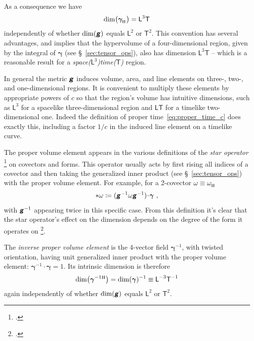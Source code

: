 \documentclass[\ifafour a4paper,12pt,\else a5paper,10pt,\fi%
onecolumn,oneside,article,%
british%
]{memoir}
\makeatletter
\theoremstyle{remark}
\theoremstyle{innote}
\newcommand*{\mathte}[1]{\textbf{\textit{\textsf{#1}}}}
\newcommand*{\citep}{\footcites}
\newcommand*{\defd}{\coloneqq}
\renewcommand*{\|}[1][]{\nonscript\,#1\vert\nonscript\;\mathopen{}}
\newcommand*{\sect}{\S}%
\newcommand*{\sects}{\S\S}%
\newcommand*{\eg}{{e.g.}}
\newcommand*{\cf}{{cf.}}
\newcommand*{\q}{}%
\DeclareRobustCommand*{\q}{%
  \mathord{\mathpalette\bigcdot@{}}%
}
\newcommand*{\bigcdot@scalefactor}{0.7}
\newcommand*{\bigcdot@widthfactor}{1.5}
\newcommand*{\bigcdot@}[2]{%
  \sbox0{$#1\vcenter{}$}%
  \sbox2{$#1\cdot\m@th$}%
  \hbox to \bigcdot@widthfactor\wd2{%
    \hfil
    \raise\ht0\hbox{%
      \scalebox{\bigcdot@scalefactor}{%
        \lower\ht0\hbox{$#1\bullet\m@th$}%
      }%
    }%
    \hfil
  }%
}
\newcommand*{\Le}{\textsf{L}}
\newcommand*{\Ti}{\textsf{T}}
\newcommand*{\Li}{\textsf{L}}
\newcommand*{\ii}{\mathbin{\!\cdot\!}}
\newcommand*{\yg}{\mathte{g}}
\renewcommand*{\i}{\indices}
\newcommand*{\ygv}{\bm{\gamma}}
\newcommand*{\rul}{{\mkern2mu\rule[-0.1ex]{0.75pt}{1.1ex}\mkern2mu}}
\DeclarePairedDelimiter\mul{\rul}{\rul}%
\makeatother
\begin{document}
As a consequence we have
\begin{equation}
  \label{eq:dim_volume_elem}
  \dim\bigl(\ygv\i{_{\mul{\q\q\q\q}}}\bigr) = \Le^{3}\Ti
\end{equation}
independently of whether $\dim(\yg)$ equals $\Li^{2}$ or $\Ti^{2}$. This
convention has several advantages, and implies that the hypervolume of a
four-dimensional region, given by the integral of $\ygv$ (see
\sect~\ref{sec:tensor_ops}), also has dimension $\Li^{3}\Ti$ -- which is a
reasonable result for a
\emph{space\textnormal{($\Le^{3}$)}time\textnormal{($\Ti$)}} region.

In general the metric $\yg$ induces volume, area, and line elements on
three-, two-, and one-dimensional regions. It is convenient to multiply
these elements by appropriate powers of $c$ so that the region's volume has
intuitive dimensions, such as $\Li^{3}$ for a spacelike three-dimensional
region and $\Li\Ti$ for a timelike two-dimensional one. Indeed the
definition of proper time~\eqref{eq:proper_time_c} does exactly this,
including a factor $1/c$ in the induced line element on a timelike curve.

The proper volume element appears in the various definitions of the
\emph{star operator}
\citep[\eg][\sect~V.A.4]{choquetbruhatetal1977_r1996}[Box~4.3]{misneretal1970_r1973}[\sect~IV.24]{burke1985_r1987}
on covectors and forms. This operator usually acts by first rising all
indices of a covector and then taking the generalized inner product (see
\sect~\ref{sec:tensor_ops}) with the proper volume element. For example,
for a 2-covector $\omega \equiv \omega\i{_{\mul{\q\q}}}$
\begin{equation}
  \label{eq:star_op}
  *\omega \defd (\yg^{-1}\omega\yg^{-1})\ii\ygv \ ,
\end{equation}
with $\yg^{-1}$ appearing twice in this specific case. From this definition
it's clear that the star operator's effect on the dimension depends on the
degree of the form it operates on \citep[I personally prefer to avoid the
star operator and explicitly use the inner product with the proper volume
element; \cf][\sects~4.1--2]{bossavit1991}.

The \emph{inverse proper volume element} is the 4-vector field $\ygv^{-1}$,
with twisted orientation, having unit generalized inner product with the
proper volume element: $\ygv^{-1} \ii \ygv = 1$. Its intrinsic dimension is
therefore
\begin{equation}
  \label{eq:dim_inv_volume_elem}
  \dim\bigl(\ygv^{-1}{}\i{^{\mul{\q\q\q\q}}}\bigr) =
  \dim(\ygv)^{-1} \equiv \Le^{-3}\Ti^{-1}
\end{equation}
again independently of whether $\dim(\yg)$ equals $\Li^{2}$ or $\Ti^{2}$.
\end{document}
